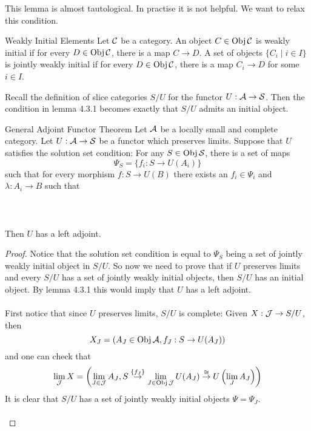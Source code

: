 \documentclass[a4paper]{article}
\begin{document}
This lemma is almost tautological. In practise it is not helpful. We want to relax this condition. 

\begin{defn}{Weakly Initial Elements}{} Let $\mathcal{C}$ be a category. An object $C\in\operatorname{Obj}\mathcal{C}$ is weakly initial if for every $D\in\operatorname{Obj}\mathcal{C}$, there is a map $C\to D$. A set of objects $\{C_i\;|\;i\in I\}$ is jointly weakly initial if for every $D\in\operatorname{Obj}\mathcal{C}$, there is a map $C_i\to D$ for some $i\in I$. 
\end{defn}

Recall the definition of slice categories $S/U$ for the functor $U:\mathcal{A}\to\mathcal{S}$. Then the condition in lemma 4.3.1 becomes exactly that $S/U$ admits an initial object. 

\begin{thm}{General Adjoint Functor Theorem}{} Let $\mathcal{A}$ be a locally small and complete category. Let $U:\mathcal{A}\to\mathcal{S}$ be a functor which preserves limits. Suppose that $U$ satisfies the solution set condition: For any $S\in\operatorname{Obj}\mathcal{S}$, there is a set of maps $$\Psi_S=\{f_i:S\to U(A_i)\}$$ such that for every morphism $f:S\to U(B)$ there exists an $f_i\in\Psi_i$ and $\lambda:A_i\to B$ such that \\~\\
\\~\\
Then $U$ has a left adjoint. \tcbline
\begin{proof}
Notice that the solution set condition is equal to $\Psi_S$ being a set of jointly weakly initial object in $S/U$. So now we need to prove that if $U$ preserves limits and every $S/U$ has a set of jointly weakly initial objects, then $S/U$ has an initial object. By lemma 4.3.1 this would imply that $U$ has a left adjoint. \\~\\

First notice that since $U$ preserves limits, $S/U$ is complete: Given $X:\mathcal{J}\to S/U$, then $$X_J=\left(A_J\in\operatorname{Obj}\mathcal{A},f_J:S\to U(A_J)\right)$$ and one can check that $$\lim_{\mathcal{J}} X=\left(\lim_{J\in\mathcal{J}}A_J,S\overset{\{f_J\}}{\to}\lim_{J\in\operatorname{Obj}\mathcal{J}}U(A_J)\overset{\cong}{\to}U\left(\lim_JA_J\right)\right)$$ It is clear that $S/U$ has a set of jointly weakly initial objects $\Psi=\Psi_J$. \\~\\


\end{proof}
\end{thm}
\end{document}
